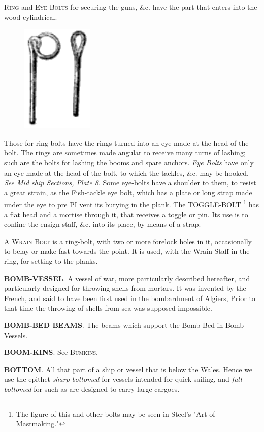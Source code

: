 \textsc{Ring} and \textsc{Eye Bolts} for securing the guns, \&c. have the part that enters into the wood cylindrical.
\begin{figure}
\begin{center}
\includegraphics[scale=0.5]{pictures/ring_eye_bolts}
\end{center}
\end{figure} 
Those for ring-bolts have the rings turned into an eye made at the head of the bolt. The rings are sometimes made angular to receive many turns of lashing; such are the bolts for lashing the booms and spare anchors. \textit{Eye Bolts} have only an eye made at the head of the bolt, to which the tackles, \&c. may be hooked. \textit{See Mid ship Sections, Plate 8}. Some eye-bolts have a shoulder to them, to resist a great strain, as the Fish-tackle eye bolt, which has a plate or long strap made under the eye to pre PI vent its burying in the plank. The TOGGLE-BOLT \footnote{The figure of this and other bolts may be seen in Steel's "Art of Mastmaking."}  has a flat head and a mortise through it, that receives a toggle or pin. Its use is to confine the ensign staff, \&c. into its place, by means of a strap. 

A \textsc{Wrain Bolt} is a ring-bolt, with two or more forelock holes in it, occasionally to belay or make fast towards the point. It is used, with the Wrain Staff in the ring, for setting-to the planks. 

\textbf{BOMB-VESSEL}. A vessel of war, more particularly described hereafter, and particularly designed for throwing shells from mortars. It was invented by the French, and said to have been first used in the bombardment of Algiers, Prior to that time the throwing of shells from sea was supposed impossible. 

\textbf{BOMB-BED BEAMS}. The beams which support the Bomb-Bed in Bomb-Vessels. 

\textbf{BOOM-KINS}. See \textsc{Bumkins}. 

\textbf{BOTTOM}. All that part of a ship or vessel that is below the Wales. Hence we use the epithet \textit{sharp-bottomed} for vessels intended for quick-sailing, and \textit{full-bottomed} for such as are designed to carry large cargoes. 

